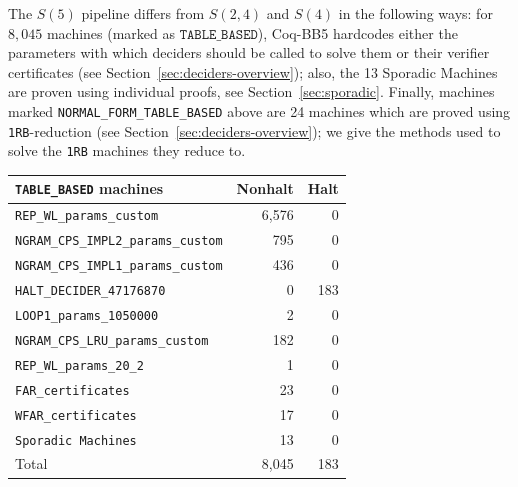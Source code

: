 \documentclass[a4paper,british]{article}
\theoremstyle{definition} %
\numberwithin{equation}{section}
\theoremstyle{definition} %
\newcommand{\CoqBB}{Coq-BB5\xspace}
\begin{document}
The $S(5)$ pipeline differs from $S(2,4)$ and $S(4)$ in the following ways: for $8{,}045$ machines (marked as $\texttt{TABLE\_BASED}$), \CoqBB hardcodes either the parameters with which deciders should be called to solve them or their verifier certificates (see Section~\ref{sec:deciders-overview}); also, the 13 Sporadic Machines are proven using individual \Coq proofs, see Section~\ref{sec:sporadic}. Finally, machines marked \texttt{NORMAL\_FORM\_TABLE\_BASED} above are 24 machines which are proved using \texttt{1RB}-reduction (see Section~\ref{sec:deciders-overview}); we give the methods used to solve the \texttt{1RB} machines they reduce to.
\begin{table}[h!]
    \centering
    \begin{minipage}{0.55\linewidth}
        \centering
        \begin{tabular}{|lrr|}
            \hline
            \texttt{TABLE\_BASED} machines             & Nonhalt & Halt \\
            \hline
            \texttt{REP\_WL\_params\_custom}           & 6{,}576 & 0    \\
            \texttt{NGRAM\_CPS\_IMPL2\_params\_custom} & 795     & 0    \\
            \texttt{NGRAM\_CPS\_IMPL1\_params\_custom} & 436     & 0    \\
            \texttt{HALT\_DECIDER\_47176870}           & 0       & 183  \\
            \texttt{LOOP1\_params\_1050000}            & 2       & 0    \\
            \texttt{NGRAM\_CPS\_LRU\_params\_custom}   & 182     & 0    \\
            \texttt{REP\_WL\_params\_20\_2}            & 1       & 0    \\
            \texttt{FAR\_certificates}                 & 23      & 0    \\
            \texttt{WFAR\_certificates}                & 17      & 0    \\
            \texttt{Sporadic Machines}                 & 13      & 0    \\
            \hline
            Total                                      & 8{,}045 & 183  \\
            \hline
        \end{tabular}
    \end{minipage}%
    \hfill
    \begin{minipage}{0.35\linewidth}
        \centering
        \begin{tabular}{|lr|}

\end{tabular}
\end{minipage}
\end{table}
\end{document}
